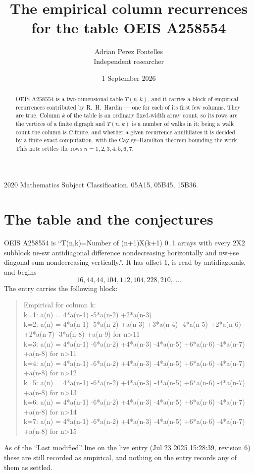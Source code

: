 \documentclass[11pt,a4paper]{article}
\title{The empirical column recurrences for the table OEIS A258554}
\author{Adrian Perez Fontelles\\ \small Independent researcher}
\date{1 September 2026}
\theoremstyle{plain}
\theoremstyle{definition}
\begin{document}
\maketitle

\begin{abstract}
OEIS A258554 is a two-dimensional table $T(n,k)$, and it carries a block of empirical
recurrences contributed by R.~H.~Hardin --- one for each of its first few columns. They are
true. Column $k$ of the table is an ordinary fixed-width array count, so its rows are the
vertices of a finite digraph and $T(n,k)$ is a number of walks in it; being a walk count the
column is $C$-finite, and whether a given recurrence annihilates it is decided by a finite
exact computation, with the Cayley--Hamilton theorem bounding the work. This note settles the rows $n=1, 2, 3, 4, 5, 6, 7$.
\end{abstract}

\noindent\small 2020 Mathematics Subject Classification. 05A15, 05B45, 15B36.\normalsize

\section{The table and the conjectures}

OEIS A258554 is ``T(n,k)=Number of (n+1)X(k+1) 0..1 arrays with every 2X2 subblock ne-sw antidiagonal difference nondecreasing horizontally and nw+se diagonal sum nondecreasing vertically.''. It has offset $1$, is
read by antidiagonals, and begins
\[
16, 44, 44, 104, 112, 104, 228, 210,\ \dots
\]
The entry carries the following block:
\begin{quote}\small
Empirical for column k:\\
k=1: a(n) = 4*a(n-1) -5*a(n-2) +2*a(n-3)\\
k=2: a(n) = 4*a(n-1) -5*a(n-2) +a(n-3) +3*a(n-4) -4*a(n-5) +2*a(n-6) +2*a(n-7) -3*a(n-8) +a(n-9) for n>11\\
k=3: a(n) = 4*a(n-1) -6*a(n-2) +4*a(n-3) -4*a(n-5) +6*a(n-6) -4*a(n-7) +a(n-8) for n>11\\
k=4: a(n) = 4*a(n-1) -6*a(n-2) +4*a(n-3) -4*a(n-5) +6*a(n-6) -4*a(n-7) +a(n-8) for n>12\\
k=5: a(n) = 4*a(n-1) -6*a(n-2) +4*a(n-3) -4*a(n-5) +6*a(n-6) -4*a(n-7) +a(n-8) for n>13\\
k=6: a(n) = 4*a(n-1) -6*a(n-2) +4*a(n-3) -4*a(n-5) +6*a(n-6) -4*a(n-7) +a(n-8) for n>14\\
k=7: a(n) = 4*a(n-1) -6*a(n-2) +4*a(n-3) -4*a(n-5) +6*a(n-6) -4*a(n-7) +a(n-8) for n>15\\
\end{quote}
As of the ``Last modified'' line on the live entry (Jul 23 2025 15:28:39, revision 6) these are still
recorded as empirical, and nothing on the entry records any of them as settled.
\end{document}
